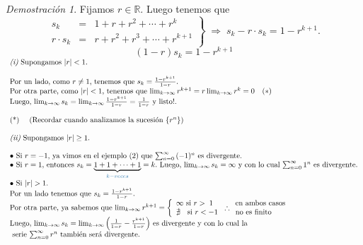 \documentclass{article}
\theoremstyle{definition}
\theoremstyle{remark}
\newtheorem*{demo}{Demostración}
\begin{document}
\begin{demo}
  Fijamos $r \in \mathbb{R} $. Luego tenemos que \[  
  \left. \begin{array}{rcl}
      s_k  & = & 1+r+r^2+ \cdots + r^k \\
      r \cdot s_k & = & r+r^2+r^3+\cdots + r^{k+1}
  \end{array} \right\} \; \Rightarrow \; s_k-r\cdot s_k=1-r^{k+1}. \]
 $$(1-r)s_k=1-r^{k+1}$$
$\begin{array}{l}
  \emph{(i)} \text{ Supongamos } |r|<1. \\\\ 
  \text{Por un lado, como $r \neq 1$, tenemos que $s_k=\frac{1-r^{k+1}}{1-r}.$} \\
\text{Por otra parte, como $|r|<1$, tenemos que $\lim_{k \to \infty}{r^{k+1}=r\lim_{k\to\infty}{r^k}=0}$} \quad (*) \\
\text{Luego, $\lim_{k \to \infty}{s_k}=\lim_{k \to \infty}{\frac{1-r^{k+1}}{1-r}}=\frac{1}{1-r}$ y listo!.} \\ \\

\text{(*) \quad (Recordar cuando analizamos la sucesión $\{r^n\}$)} \\\\ 
\emph{(ii)} \text{ Supongamos $|r| \geq 1$}. \\\\
\bullet \text{ Si $r=-1$, ya vimos en el ejemplo (2) que $\sum_{n=0}^{\infty}{(-1)^n} $ es divergente.} \\
\bullet \text{ Si $r=1$, entonces $s_k=\underbrace{1+1+\dots+1}_{\textcolor{azulp2}{k-veces}}=k.$ Luego, $\lim_{k\to\infty}{s_k=\infty}$ y con lo cual $\sum_{n=0}^{\infty}{1^n}$ es divergente.} \\
\bullet \text{ Si $|r|>1$.} \\ 
\text{Por un lado tenemos que $s_k=\frac{1-r^{k+1}}{1-r}$.} \\ 
\text{Por otra parte, ya sabemos que $\lim_{k\to\infty}{r^{k+1}}=\left\{ \begin{array}{l}
\infty \text{ si $r>\phantom{.}1$}\\
\nexists  \text{ \; si $r<-1$}
\end{array}\right. \therefore \begin{array}l 
\text{en ambos casos} \\ 
\text{no es finito}
\end{array}$}
\\
\text{Luego, $\lim_{k\to\infty}{s_k}=\lim_{k\to\infty}{\left(\frac{1}{1-r}-\frac{r^{k+1}}{1-r}\right)}$ es divergente y con lo cual la} \\ \text{ serie $\sum_{n=0}^{\infty}{r^n}$ también será divergente.}
\end{array}$\\\\
\end{demo}
\end{document}
